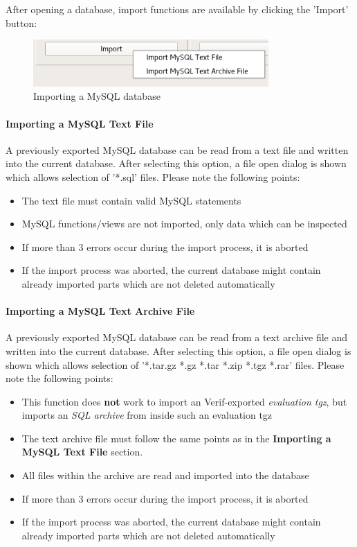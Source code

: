After opening a database, import functions are available by clicking the 'Import' button:

\begin{figure}[H]
  \center
    \includegraphics[width=9cm,frame]{../screenshots/database_import.png}
  \caption{Importing a MySQL database}
\end{figure}

\paragraph{Importing a MySQL Text File}

A previously exported MySQL database can be read from a text file and written into the current database. After selecting this option, a file open dialog is shown which allows selection of '*.sql' files. Please note the following points:

\begin{itemize}  
\item The text file must contain valid MySQL statements
\item MySQL functions/views are not imported, only data which can be inspected
\item If more than 3 errors occur during the import process, it is aborted
\item If the import process was aborted, the current database might contain already imported parts which are not deleted automatically
\end{itemize}

\paragraph{Importing a MySQL Text Archive File}

A previously exported MySQL database can be read from a text archive file and written into the current database. After selecting this option, a file open dialog is shown which allows selection of '*.tar.gz *.gz *.tar *.zip *.tgz *.rar' files. Please note the following points:

\begin{itemize}  
\item This function does \textbf{not} work to import an Verif-exported \textit{evaluation tgz}, but imports an \textit{SQL archive} from inside such an evaluation tgz
\item The text archive file must follow the same points as in the \textbf{Importing a MySQL Text File} section.
\item All files within the archive are read and imported into the database
\item If more than 3 errors occur during the import process, it is aborted
\item If the import process was aborted, the current database might contain already imported parts which are not deleted automatically
\end{itemize}

